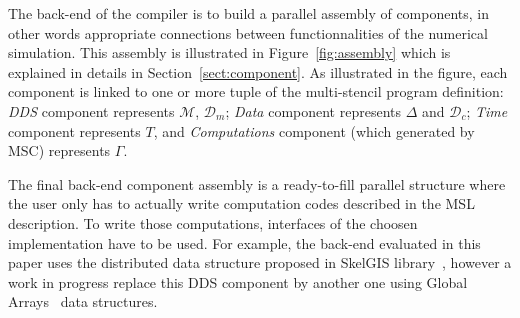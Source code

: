 The back-end of the compiler is to build a parallel assembly of components, in other words appropriate connections between functionnalities of the numerical simulation. This assembly is illustrated in Figure~\ref{fig:assembly} which is explained in details in Section~\ref{sect:component}. As illustrated in the figure, each component is linked to one or more tuple of the multi-stencil program definition: \emph{DDS} component represents $\mathcal{M}$, $\mathcal{D}_m$; \emph{Data} component represents $\Delta$ and $\mathcal{D}_c$; \emph{Time} component represents $T$, and \emph{Computations} component (which generated by MSC) represents $\Gamma$.

The final back-end component assembly is a ready-to-fill parallel structure where the user only has to actually write computation codes described in the MSL description. To write those computations, interfaces of the choosen implementation have to be used. For example, the back-end evaluated in this paper uses the distributed data structure proposed in SkelGIS library~\cite{CPE:CPE3494}, however a work in progress replace this DDS component by another one using Global Arrays~\cite{Nieplocha:2006:AAP:1125980.1125985} data structures.



